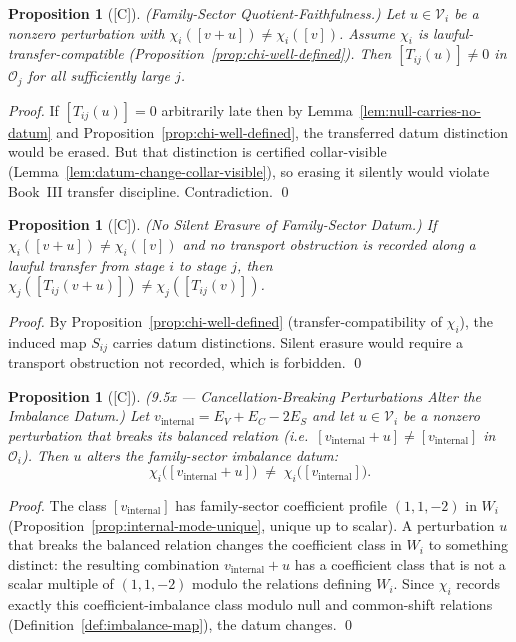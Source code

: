 \documentclass[12pt,oneside]{amsbook}
\theoremstyle{plain}
\newtheorem{proposition}[theorem]{Proposition}
\theoremstyle{definition}
\theoremstyle{remark}
\newcommand{\status}[1]{\textup{[#1]}}
\begin{document}
\begin{proposition}[\status{C}]\label{prop:family-sector-quotient-faithful}
\textup{(Family-Sector Quotient-Faithfulness.)}
Let $u \in \mathcal{V}_i$ be a nonzero perturbation with
$\chi_i([v+u]) \neq \chi_i([v])$.  Assume $\chi_i$ is
lawful-transfer-compatible (Proposition~\ref{prop:chi-well-defined}).
Then $[T_{ij}(u)] \neq 0$ in $\mathcal{O}_j$ for all sufficiently
large $j$.
\end{proposition}

\begin{proof}
If $[T_{ij}(u)]=0$ arbitrarily late then by
Lemma~\ref{lem:null-carries-no-datum} and
Proposition~\ref{prop:chi-well-defined}, the transferred datum
distinction would be erased.  But that distinction is
certified collar-visible (Lemma~\ref{lem:datum-change-collar-visible}),
so erasing it silently would violate Book~III transfer
discipline.  Contradiction. \qed
\end{proof}

\begin{proposition}[\status{C}]\label{prop:family-sector-faithfulness-lv}
\textup{(No Silent Erasure of Family-Sector Datum.)}
If $\chi_i([v+u]) \neq \chi_i([v])$ and no transport obstruction is
recorded along a lawful transfer from stage $i$ to stage $j$, then
$\chi_j([T_{ij}(v+u)]) \neq \chi_j([T_{ij}(v)])$.
\end{proposition}

\begin{proof}
By Proposition~\ref{prop:chi-well-defined} (transfer-compatibility of
$\chi_i$), the induced map $S_{ij}$ carries datum distinctions.
Silent erasure would require a transport obstruction not recorded,
which is forbidden. \qed
\end{proof}

\begin{proposition}[\status{C}]\label{prop:cancellation-breaks-datum}
\textup{(9.5x --- Cancellation-Breaking Perturbations Alter the Imbalance Datum.)}
Let $v_{\mathrm{internal}} = E_V + E_C - 2E_S$ and let
$u \in \mathcal{V}_i$ be a nonzero perturbation that breaks its
balanced relation (i.e.\ $[v_{\mathrm{internal}}+u] \neq
[v_{\mathrm{internal}}]$ in $\mathcal{O}_i$).  Then $u$ alters the
family-sector imbalance datum:
\[
  \chi_i\!\bigl([v_{\mathrm{internal}}+u]\bigr) \;\neq\;
  \chi_i\!\bigl([v_{\mathrm{internal}}]\bigr).
\]
\end{proposition}

\begin{proof}
The class $[v_{\mathrm{internal}}]$ has family-sector coefficient
profile $(1,1,-2)$ in $W_i$
(Proposition~\ref{prop:internal-mode-unique}, unique up to scalar).
A perturbation $u$ that breaks the balanced relation changes the
coefficient class in $W_i$ to something distinct: the resulting
combination $v_{\mathrm{internal}} + u$ has a coefficient class that
is not a scalar multiple of $(1,1,-2)$ modulo the relations defining
$W_i$.  Since $\chi_i$ records exactly this coefficient-imbalance
class modulo null and common-shift relations
(Definition~\ref{def:imbalance-map}), the datum changes. \qed
\end{proof}
\end{document}
